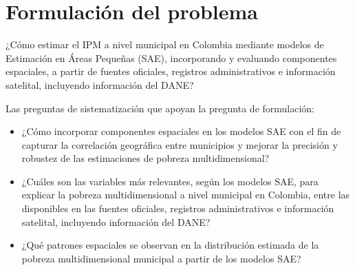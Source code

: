 
\section{Formulación del problema}

¿Cómo estimar el IPM a nivel municipal en Colombia mediante modelos de Estimación en Áreas Pequeñas (SAE), incorporando y evaluando componentes espaciales, a partir de fuentes oficiales, registros administrativos e información satelital, incluyendo información del DANE?

Las preguntas de sistematización que apoyan la pregunta de formulación:

\begin{itemize}

    \item ¿Cómo incorporar componentes espaciales en los modelos SAE con el fin de capturar la correlación geográfica entre municipios y mejorar la precisión y robustez de las estimaciones de pobreza multidimensional?

    \item ¿Cuáles son las variables más relevantes, según los modelos SAE, para explicar la pobreza multidimensional a nivel municipal en Colombia, entre las disponibles en las fuentes oficiales, registros administrativos e información satelital, incluyendo información del DANE?

    \item ¿Qué patrones espaciales se observan en la distribución estimada de la pobreza multidimensional municipal a partir de los modelos SAE?
    
\end{itemize}
